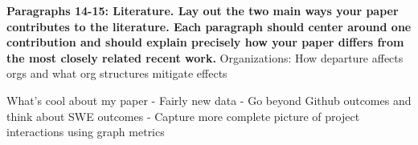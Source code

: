 \documentclass[source/paper/main.tex]{subfiles}
\begin{document}
\textbf{Paragraphs 14-15: Literature. Lay out the two main ways your paper contributes to the literature. Each paragraph should center around one contribution and should explain precisely how your paper differs from the most closely related recent work.}
Organizations: How departure affects orgs and what org structures mitigate effects

What's cool about my paper
- Fairly new data
- Go beyond Github outcomes and think about SWE outcomes
- Capture more complete picture of project interactions using graph metrics
\end{document}
